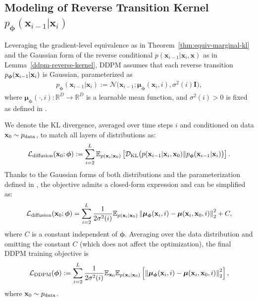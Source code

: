 \subsection{Modeling of Reverse Transition Kernel $p_{\bm{\phi}}(\mathbf{x}_{i-1}|\mathbf{x}_i)$} Leveraging the gradient-level equivalence as in Theorem~\ref{thm:equiv-marginal-kl} and the Gaussian form of the reverse conditional $p(\mathbf{x}_{i-1}|\mathbf{x}_i, \mathbf{x})$ as in Lemma~\ref{ddpm-reverse-kernel}, DDPM assumes that each reverse transition $p_{\bm{\phi}}({\mathbf{x}}_{i-1}| {\mathbf{x}}_i)$ is Gaussian, parameterized as
\begin{align}\label{eq:def-reverse}
    p_{\bm{\phi}}(\mathbf{x}_{i-1}|\mathbf{x}_i) := \mathcal{N}\big(\mathbf{x}_{i-1}; \bm{\mu}_{\bm{\phi}}(\mathbf{x}_i, i), \sigma^2(i) \mathbf{I}\big),
\end{align}
where $\bm{\mu}_{\bm{\phi}}(\cdot, i) \colon \mathbb{R}^D \to \mathbb{R}^D$ is a learnable mean function, and $\sigma^2(i) > 0$ is fixed as defined in .

We denote the KL divergence, averaged over time steps $i$ and conditioned on data ${\mathbf{x}}_0 \sim p_{\text{data}}$, to match all layers of distributions as:
\begin{align}\label{eq:ddpm-diffusion}
    \mathcal{L}_{\text{diffusion}}({\mathbf{x}}_0;\bm{\phi}) := \sum_{i=2}^L \mathbb{E}_{p({\mathbf{x}}_i|{\mathbf{x}}_0)}\left[\mathcal{D}_{\text{KL}}\big(p({\mathbf{x}}_{i-1}|{\mathbf{x}}_i, {\mathbf{x}}_0)  \Vert  p_{\bm{\phi}}({\mathbf{x}}_{i-1}|{\mathbf{x}}_i)\big)\right].
\end{align}
Thanks to the Gaussian forms of both distributions and the parameterization defined in , the objective admits a closed-form expression and can be simplified as:
\begin{align}\label{eq:ddpm-diffusion-simp}
    \mathcal{L}_{\text{diffusion}}({\mathbf{x}}_0;\bm{\phi}) = \sum_{i=2}^L \frac{1}{2\sigma^2(i)}  \mathbb{E}_{p({\mathbf{x}}_i|{\mathbf{x}}_0)}\left\| \bm{\mu}_{\bm{\phi}}({\mathbf{x}}_i, i) - \bm{\mu}({\mathbf{x}}_i, {\mathbf{x}}_0, i) \right\|_2^2 + C,
\end{align}
where $C$ is a constant independent of $\bm{\phi}$. Averaging over the data distribution and omitting the constant $C$ (which does not affect the optimization), the final DDPM training objective is
\begin{align}
\begin{aligned}
    \label{eq:ddpm-mean-loss}
    \mathcal{L}_{\text{DDPM}}(\bm{\phi}) := \sum_{i=2}^L \frac{1}{2\sigma^2(i)}  \mathbb{E}_{{\mathbf{x}}_0} \mathbb{E}_{p(\mathbf{x}_i|{\mathbf{x}}_0)} \left[ \left\| \bm{\mu}_{\bm{\phi}}(\mathbf{x}_i, i) - \bm{\mu}(\mathbf{x}_i, {\mathbf{x}}_0, i) \right\|_2^2 \right],
\end{aligned}
\end{align}
where ${\mathbf{x}}_0\sim p_{\mathrm{data}}$.

